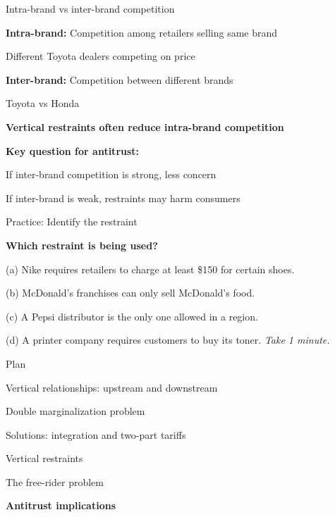\documentclass[notes,11pt, aspectratio=169]{beamer}
\newenvironment{wideitemize}{\itemize\addtolength{\itemsep}{10pt}}{\enditemize}
\newenvironment{wideenumerate}{\enumerate\addtolength{\itemsep}{10pt}}{\endenumerate}
\begin{document}
\begin{frame}{Intra-brand vs inter-brand competition}
	\begin{wideitemize}
		\item \textbf{Intra-brand:} Competition among retailers selling same brand
		\begin{wideitemize}
			\vspace{5pt}
			\item Different Toyota dealers competing on price
		\end{wideitemize}
		\item \textbf{Inter-brand:} Competition between different brands
		\begin{wideitemize}
			\vspace{5pt}
			\item Toyota vs Honda
		\end{wideitemize}
		\item \textbf{Vertical restraints often reduce intra-brand competition}
		\item \textbf{Key question for antitrust:}
		\begin{wideitemize}
			\vspace{5pt}
			\item If inter-brand competition is strong, less concern
			\item If inter-brand is weak, restraints may harm consumers
		\end{wideitemize}
	\end{wideitemize}
\end{frame}

\begin{frame}{Practice: Identify the restraint}
	\begin{wideitemize}
		\item \textbf{Which restraint is being used?}
		\item (a) Nike requires retailers to charge at least \$150 for certain shoes.
		\item (b) McDonald's franchises can only sell McDonald's food.
		\item (c) A Pepsi distributor is the only one allowed in a region.
		\item (d) A printer company requires customers to buy its toner.
	\end{wideitemize}
	\vspace{10pt}
	\centering
	\textit{Take 1 minute.}
\end{frame}

\begin{frame}{Plan}
  \begin{wideenumerate}
    \item Vertical relationships: upstream and downstream
    \item Double marginalization problem
    \item Solutions: integration and two-part tariffs
    \item Vertical restraints
    \item The free-rider problem
    \item \textbf{Antitrust implications}
  \end{wideenumerate}
\end{frame}
\end{document}
